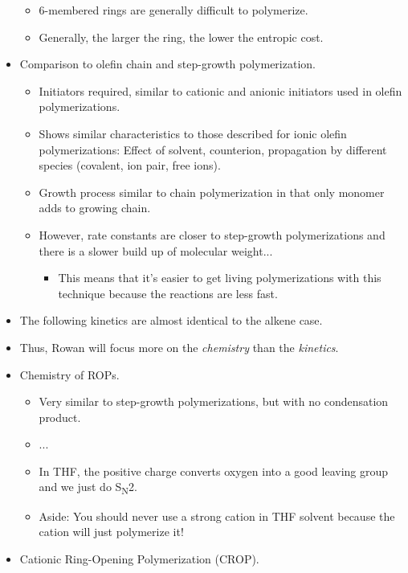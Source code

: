 \documentclass[../notes.tex]{subfiles}
\begin{document}
\begin{itemize}
\begin{itemize}
        \item 6-membered rings are generally difficult to polymerize.
        \item Generally, the larger the ring, the lower the entropic cost.
    \end{itemize}
    \item Comparison to olefin chain and step-growth polymerization.
    \begin{itemize}
        \item Initiators required, similar to cationic and anionic initiators used in olefin polymerizations.
        \item Shows similar characteristics to those described for ionic olefin polymerizations: Effect of solvent, counterion, propagation by different species (covalent, ion pair, free ions).
        \item Growth process similar to chain polymerization in that only monomer adds to growing chain.
        \item However, rate constants are closer to step-growth polymerizations and there is a slower build up of molecular weight...
        \begin{itemize}
            \item This means that it's easier to get living polymerizations with this technique because the reactions are less fast.
        \end{itemize}
    \end{itemize}
    \item The following kinetics are almost identical to the alkene case.
    \item Thus, Rowan will focus more on the \emph{chemistry} than the \emph{kinetics}.
    \item Chemistry of ROPs.
    \begin{itemize}
        \item Very similar to step-growth polymerizations, but with no condensation product.
        \item ...
        \item In THF, the positive charge converts oxygen into a good leaving group and we just do S\textsubscript{N}2.
        \item Aside: You should never use a strong cation in THF solvent because the cation will just polymerize it!
    \end{itemize}
    \item Cationic Ring-Opening Polymerization (CROP).
    \begin{itemize}

\end{itemize}
\end{itemize}
\end{document}
